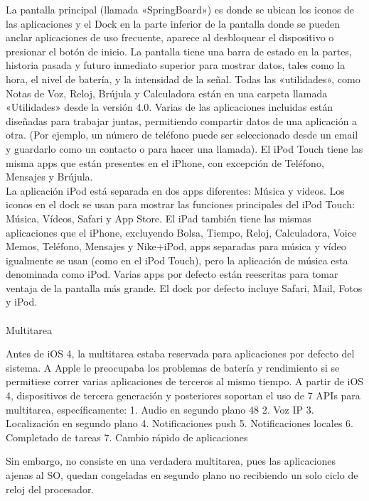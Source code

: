 	La pantalla principal (llamada «SpringBoard») es donde se ubican los iconos de las aplicaciones y el Dock en la parte inferior de la pantalla donde se pueden anclar aplicaciones de uso frecuente, aparece al desbloquear el dispositivo o presionar el botón de inicio. La pantalla tiene una barra de estado en la partes, historia pasada y futuro inmediato superior para mostrar datos, tales como la hora, el nivel de batería, y la intensidad de la señal. Todas las «utilidades», como Notas de Voz, Reloj, Brújula y Calculadora están en una carpeta llamada «Utilidades» desde la versión 4.0. Varias de las aplicaciones incluidas están diseñadas para trabajar juntas, permitiendo compartir datos de una aplicación a otra. (Por ejemplo, un número de teléfono puede ser seleccionado desde un email y guardarlo como un contacto o para hacer una llamada). El iPod Touch tiene las misma apps que están presentes en el iPhone, con excepción de Teléfono, Mensajes y Brújula.\\ 
	
	La aplicación iPod está separada en dos apps diferentes: Música y videos. Los iconos en el dock se usan para mostrar las funciones principales del iPod Touch: Música, Vídeos, Safari y App Store. El iPad también tiene las mismas aplicaciones que el iPhone, excluyendo Bolsa, Tiempo, Reloj, Calculadora, Voice Memos, Teléfono, Mensajes y Nike+iPod, apps separadas para música y vídeo igualmente se usan (como en el iPod Touch), pero la aplicación de música esta denominada como iPod. Varias apps por defecto están reescritas para tomar ventaja de la pantalla más grande. El dock por defecto incluye Safari, Mail, Fotos y iPod.\\ \\
	Multitarea 
	
	Antes de iOS 4, la multitarea estaba reservada para aplicaciones por defecto del sistema. A Apple le preocupaba los problemas de batería y rendimiento si se permitiese correr varias aplicaciones de terceros al mismo tiempo. A partir de iOS 4, dispositivos de tercera generación y posteriores soportan el uso de 7 APIs para multitarea, específicamente:
	1. Audio en segundo plano 48
	2. Voz IP
	3. Localización en segundo plano
	4. Notificaciones push
	5. Notificaciones locales
	6. Completado de tareas
	7. Cambio rápido de aplicaciones
	
	Sin embargo, no consiste en una verdadera multitarea, pues las aplicaciones ajenas al SO, quedan congeladas en segundo plano no recibiendo un solo ciclo de reloj del procesador.
	
